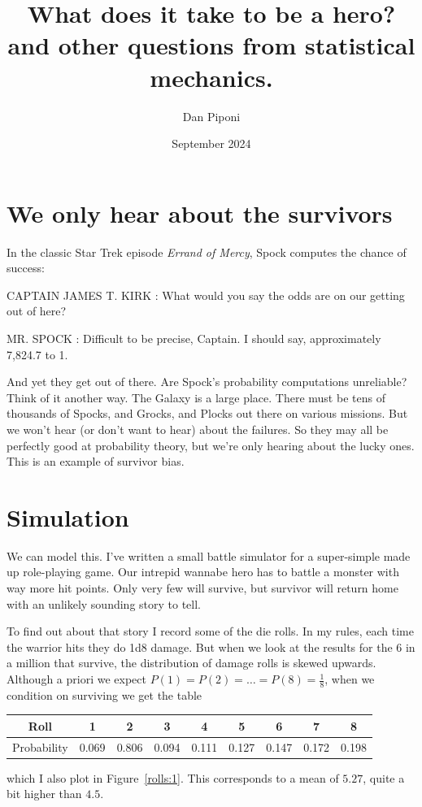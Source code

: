 \documentclass[12pt]{article}
\title{What does it take to be a hero? and other questions from statistical mechanics.}
\author{Dan Piponi}
\date{September 2024}
\begin{document}
\maketitle

\section{We only hear about the survivors}
In the classic Star Trek episode \emph{Errand of Mercy}, Spock computes the chance of success:
\begin{displayquote}
CAPTAIN JAMES T. KIRK : What would you say the odds are on our getting out of here?

MR. SPOCK : Difficult to be precise, Captain. I should say, approximately 7,824.7 to 1.
\end{displayquote}
And yet they get out of there. Are Spock's probability computations unreliable?
Think of it another way. The Galaxy is a large place.
There must be tens of thousands of Spocks, and Grocks, and Plocks out there on various missions.
But we won't hear (or don't want to hear) about the failures.
So they may all be perfectly good at probability theory, but we're only hearing about the lucky ones.
This is an example of survivor bias.

\section{Simulation}
We can model this.
I've written a small battle simulator for a super-simple made up role-playing game.
Our intrepid wannabe hero has to battle a monster with way more hit points.
Only very few will survive, but survivor will return home with an unlikely sounding story to tell.

To find out about that story I record some of the die rolls.
In my rules, each time the warrior hits they do 1d8 damage.
But when we look at the results for the 6 in a million that survive, the distribution of damage rolls is skewed upwards.
Although a priori we expect $P(1)=P(2)=\ldots=P(8)=\frac{1}{8}$, when we condition on surviving we
get the table
\begin{center}
\begin{tabular}{|c|c|c|c|c|c|c|c|c|}
\hline
Roll & 1 & 2 & 3 & 4 & 5 & 6 & 7 & 8\\
\hline
Probability & 0.069 & 0.806 & 0.094 & 0.111 & 0.127 & 0.147 & 0.172 & 0.198\\
\hline
\end{tabular}
\end{center}
which I also plot in Figure~\ref{rolls:1}.
This corresponds to a mean of $5.27$, quite a bit higher than $4.5$.
\end{document}
